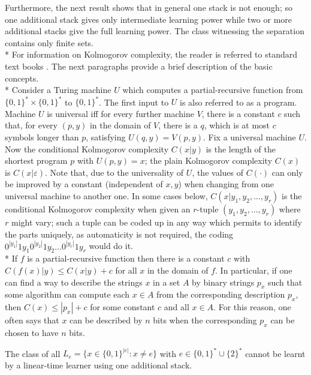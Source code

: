 \documentclass{LMCS}
\theoremstyle{plain}\newtheorem{athm}[thm]{Theorem}
\theoremstyle{plain}\newtheorem{aprop}[thm]{Proposition}
\theoremstyle{plain}\newtheorem{aprob}[thm]{Open Problem}
\theoremstyle{plain}\newtheorem{acor}[thm]{Corollary}
\theoremstyle{plain}\newtheorem{alem}[thm]{Lemma}
\theoremstyle{definition}\newtheorem{adefn}[thm]{Definition}
\theoremstyle{definition}\newtheorem{arem}[thm]{Remark}
\theoremstyle{plain}\newtheorem{aexmp}[thm]{Example}
\theoremstyle{plain}\newtheorem{aclm}[thm]{Claim}
\def\sp{\\*\indent}
\begin{document}
\noindent
Furthermore, the next result shows that in general one stack is not enough;
so one additional stack gives only intermediate learning power while two
or more additional stacks give the full learning power. The class witnessing
the separation contains only finite sets.
\sp
For information on Kolmogorov complexity,
the reader is referred to standard text books \cite{Ca02,DH10,LV08,Ni09}. 
The next paragraphs provide a brief description of the basic concepts.
\sp
Consider a Turing machine $U$ which computes a partial-recursive function from 
$\{0,1\}^* \times
\{0,1\}^*$ to $\{0,1\}^*$. The first input to $U$ 
is also referred to as a program.
Machine $U$ is universal iff for every further
machine $V$, there is a constant $c$ such that, for every $(p,y)$
in the domain of $V$, there is a $q$, which is at most $c$ symbols longer than
$p$, satisfying $U(q,y)= V(p,y)$. 
Fix a universal machine $U$. Now the conditional
Kolmogorov complexity $C(x|y)$ is the length of the shortest program
$p$ with $U(p,y) = x$; the plain Kolmogorov complexity $C(x)$
is $C(x|\varepsilon)$. Note that, due to the universality of $U$,
the values of $C(\cdot)$ can only be improved by a constant 
(independent of $x,y$)
when changing from one universal machine to another one.
In some cases below, $C(x| y_1,y_2,\ldots,y_r)$ is the conditional
Kolmogorov complexity when given an $r$-tuple $(y_1,y_2,\ldots,y_r)$
where $r$ might vary; such a tuple can be coded up in any way which
permits to identify the parts uniquely, as automaticity is not required,
the coding $0^{|y_1|} 1 y_1 0^{|y_2|} 1 y_2 \ldots 0^{|y_r|} 1 y_r$ would do it.
\sp
If $f$ is a partial-recursive function then there is a constant $c$ with
$C(f(x)|y) \leq C(x|y)+c$ for all $x$ in the domain of $f$. In particular,
if one can find a way to describe the strings $x$ in a set $A$
by binary strings $p_x$
such that some algorithm can compute each $x \in A$
from the corresponding description $p_x$, then $C(x) \leq |p_x|+c$
for some constant $c$ and all $x \in A$. For this reason, one often
says that $x$ can be described by $n$ bits when the corresponding
$p_x$ can be chosen to have $n$ bits.

\begin{thm} \label{th:stackminusage}
The class of all $L_e = \{x \in \{0,1\}^{|e|}: x \neq e\}$ with
$e \in \{0,1\}^* \cup \{2\}^*$ cannot be learnt by a linear-time learner using
one additional stack.
\end{thm}
\end{document}
